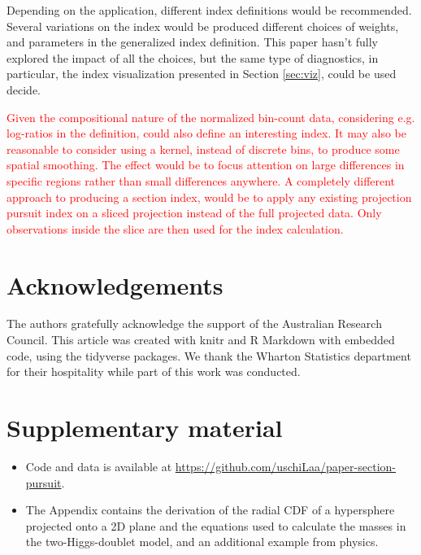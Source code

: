 \documentclass[]{interact}
\theoremstyle{plain}%
\theoremstyle{definition}
\theoremstyle{remark}
\def\tightlist{}
\begin{document}
Depending on the application, different index definitions would be
recommended. Several variations on the index would be produced different
choices of weights, and parameters in the generalized index definition.
This paper hasn't fully explored the impact of all the choices, but the
same type of diagnostics, in particular, the index visualization
presented in Section \ref{sec:viz}, could be used decide.

\textcolor{red}{Given the compositional nature of the normalized bin-count data, considering e.g. log-ratios in the definition, could also define an interesting index. It may also be reasonable to consider using a kernel, instead of discrete bins, to produce some spatial smoothing. The effect would be to focus attention on large differences in specific regions rather than small differences anywhere. A completely different approach  to producing a section index, would be to apply any existing projection pursuit index on a sliced projection instead of the full projected data. Only observations inside the slice are then used for the index calculation.}

\hypertarget{acknowledgements}{%
\section*{Acknowledgements}\label{acknowledgements}}

The authors gratefully acknowledge the support of the Australian
Research Council. This article was created with knitr \citep{knitr} and
R Markdown \citep{rmarkdown} with embedded code, using the tidyverse
\citep{tidyverse} packages. We thank the Wharton Statistics department
for their hospitality while part of this work was conducted.

\hypertarget{supplementary-material}{%
\section*{Supplementary material}\label{supplementary-material}}

\begin{itemize}
\tightlist
\item
  Code and data is available at
  \url{https://github.com/uschiLaa/paper-section-pursuit}.
\item
  The Appendix contains the derivation of the radial CDF of a
  hypersphere projected onto a 2D plane and the equations used to
  calculate the masses in the two-Higgs-doublet model, and an additional
  example from physics.
\end{itemize}



\end{document}
